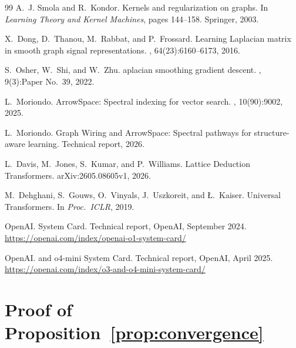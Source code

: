 \documentclass[12pt,a4paper]{article}
\theoremstyle{plain}
\theoremstyle{definition}
\theoremstyle{remark}
\newcommand{\1}{\mathbf{1}}
\begin{document}
\begin{thebibliography}{99}
A.~J. Smola and R.~Kondor.
\newblock Kernels and regularization on graphs.
\newblock In {\em Learning Theory and Kernel Machines}, pages 144--158.
\newblock Springer, 2003.

X.~Dong, D.~Thanou, M.~Rabbat, and P.~Frossard.
\newblock Learning {L}aplacian matrix in smooth graph signal representations.
, 64(23):6160--6173, 2016.

S.~Osher, W.~Shi, and W.~Zhu.
aplacian smoothing gradient descent.
, 9(3):Paper No.~39, 2022.

L.~Moriondo.
\newblock ArrowSpace: Spectral indexing for vector search.
, 10(90):9002, 2025.

L.~Moriondo.
\newblock Graph Wiring and ArrowSpace: Spectral pathways for structure-aware learning.
\newblock Technical report, 2026.

L.~Davis, M.~Jones, S.~Kumar, and P.~Williams.
\newblock Lattice Deduction Transformers.
\newblock arXiv:2605.08605v1, 2026.

M.~Dehghani, S.~Gouws, O.~Vinyals, J.~Uszkoreit, and {\L}.~Kaiser.
\newblock Universal Transformers.
\newblock In {\em Proc.\ ICLR}, 2019.

OpenAI.
 System Card.
\newblock Technical report, OpenAI, September 2024.
\newblock \url{https://openai.com/index/openai-o1-system-card/}

OpenAI.
 and {o4-mini} System Card.
\newblock Technical report, OpenAI, April 2025.
\newblock \url{https://openai.com/index/o3-and-o4-mini-system-card/}

\end{thebibliography}

\newpage
\appendix

\section{Proof of Proposition~\ref{prop:convergence}}
\label{app:proof_sketch}
\end{document}
